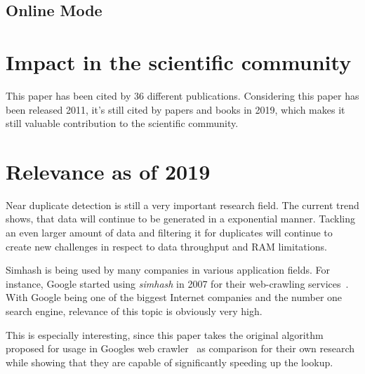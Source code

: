 \documentclass[12pt,a4paper,DIV=calc]{scrartcl}
\begin{document}
\subsection{Online Mode}


\section{Impact in the scientific community}
This paper has been cited by 36 different publications.
Considering this paper has been released 2011, it's still cited by papers and books in 2019, which makes it still valuable contribution to the scientific community.

\section{Relevance as of 2019}
Near duplicate detection is still a very important research field.
The current trend shows, that data will continue to be generated in a exponential manner.
Tackling an even larger amount of data and filtering it for duplicates will continue to create new challenges in respect to data throughput and RAM limitations.

Simhash is being used by many companies in various application fields.
For instance, Google started using \emph{simhash} in 2007 for their web-crawling services~\cite{Manku:2007:DNW:1242572.1242592}.
With Google being one of the biggest Internet companies and the number one search engine, relevance of this topic is obviously very high.

This is especially interesting, since this paper takes the original algorithm proposed for usage in Googles web crawler~\cite{Manku:2007:DNW:1242572.1242592} as comparison for their own research while showing that they are capable of significantly speeding up the lookup.

\printbibliography
\end{document}
